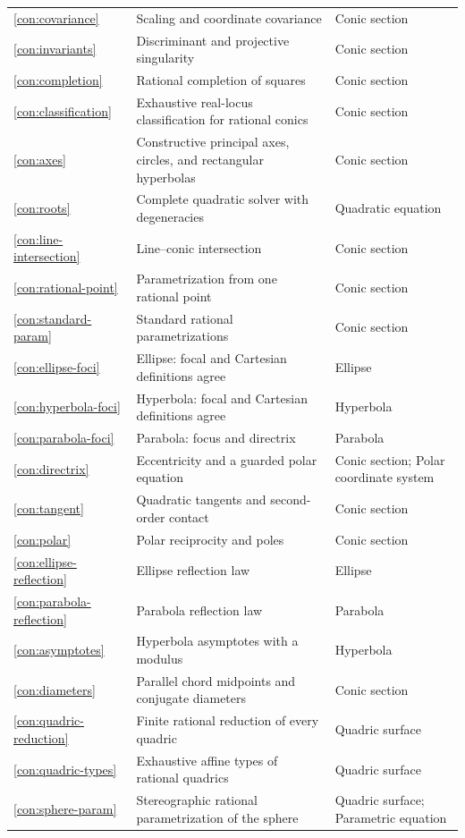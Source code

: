 \begin{longtable}{p{.08\linewidth}p{.55\linewidth}p{.28\linewidth}}
\ref{con:covariance} & Scaling and coordinate covariance & Conic section \\
\ref{con:invariants} & Discriminant and projective singularity & Conic section \\
\ref{con:completion} & Rational completion of squares & Conic section \\
\ref{con:classification} & Exhaustive real-locus classification for rational conics & Conic section \\
\ref{con:axes} & Constructive principal axes, circles, and rectangular hyperbolas & Conic section \\
\ref{con:roots} & Complete quadratic solver with degeneracies & Quadratic equation \\
\ref{con:line-intersection} & Line--conic intersection & Conic section \\
\ref{con:rational-point} & Parametrization from one rational point & Conic section \\
\ref{con:standard-param} & Standard rational parametrizations & Conic section \\
\ref{con:ellipse-foci} & Ellipse: focal and Cartesian definitions agree & Ellipse \\
\ref{con:hyperbola-foci} & Hyperbola: focal and Cartesian definitions agree & Hyperbola \\
\ref{con:parabola-foci} & Parabola: focus and directrix & Parabola \\
\ref{con:directrix} & Eccentricity and a guarded polar equation & Conic section; Polar coordinate system \\
\ref{con:tangent} & Quadratic tangents and second-order contact & Conic section \\
\ref{con:polar} & Polar reciprocity and poles & Conic section \\
\ref{con:ellipse-reflection} & Ellipse reflection law & Ellipse \\
\ref{con:parabola-reflection} & Parabola reflection law & Parabola \\
\ref{con:asymptotes} & Hyperbola asymptotes with a modulus & Hyperbola \\
\ref{con:diameters} & Parallel chord midpoints and conjugate diameters & Conic section \\
\ref{con:quadric-reduction} & Finite rational reduction of every quadric & Quadric surface \\
\ref{con:quadric-types} & Exhaustive affine types of rational quadrics & Quadric surface \\
\ref{con:sphere-param} & Stereographic rational parametrization of the sphere & Quadric surface; Parametric equation \\

\end{longtable}
